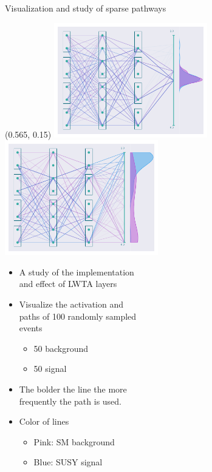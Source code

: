 \documentclass[UKenglish]{beamer}
\begin{document}
\begin{frame}{Visualization and study of sparse pathways}
    \begin{textblock}{0.8}(0.565, 0.15)
        \includegraphics[width = 0.5\textwidth]{figures/NetworkVis/BeforeTraining.pdf}
        \includegraphics[width = 0.5\textwidth]{figures/NetworkVis/AfterTraining.pdf}
    \end{textblock}
    \begin{itemize}
        \item A study of the implementation \\
        and effect of LWTA layers
        \item Visualize the activation and \\
        paths of 100 randomly sampled \\
        events
        \begin{itemize}
            \item 50 background
            \item 50 signal
        \end{itemize}
        \item The bolder the line the more\\ 
        frequently the path is used.
        \item Color of lines 
        \begin{itemize}
            \item Pink: SM background
            \item Blue: SUSY signal
        \end{itemize}
    \end{itemize}
\end{frame}
\end{document}
